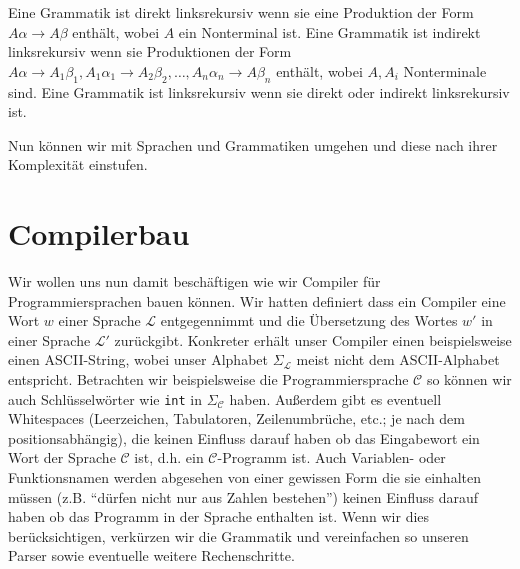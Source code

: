 \begin{defn}[Linksrekursiv]
Eine Grammatik ist direkt linksrekursiv wenn sie eine Produktion der Form $A\alpha \to A\beta$ enthält, wobei $A$ ein Nonterminal ist.
Eine Grammatik ist indirekt linksrekursiv wenn sie Produktionen der Form $A\alpha \to A_1\beta_1, A_1 \alpha_1 \to A_2\beta_2, \ldots, A_n \alpha_n \to A\beta_n$ enthält, wobei $A,A_i$ Nonterminale sind.
Eine Grammatik ist linksrekursiv wenn sie direkt oder indirekt linksrekursiv ist.
\end{defn}

Nun können wir mit Sprachen und Grammatiken umgehen und diese nach ihrer Komplexität einstufen.

\section{Compilerbau}
Wir wollen uns nun damit beschäftigen wie wir Compiler für Programmiersprachen bauen können.
Wir hatten definiert dass ein Compiler eine Wort $w$ einer Sprache $\mathcal{L}$ entgegennimmt und
die Übersetzung des Wortes $w'$ in einer Sprache $\mathcal{L}'$ zurückgibt.
Konkreter erhält unser Compiler einen beispielsweise einen ASCII-String, wobei unser Alphabet $\Sigma_\mathcal{L}$ meist
nicht dem ASCII-Alphabet entspricht. Betrachten wir beispielsweise die Programmiersprache $\mathcal{C}$ so können wir
auch Schlüsselwörter wie \verb|int| in $\Sigma_\mathcal{C}$ haben.
Außerdem gibt es eventuell Whitespaces (Leerzeichen, Tabulatoren, Zeilenumbrüche, etc.; je nach dem positionsabhängig), die keinen Einfluss darauf haben ob das
Eingabewort ein Wort der Sprache $\mathcal{C}$ ist, d.h. ein $\mathcal{C}$-Programm ist. Auch Variablen- oder Funktionsnamen werden abgesehen von einer
gewissen Form die sie einhalten müssen (z.B. ``dürfen nicht nur aus Zahlen bestehen'') keinen Einfluss darauf haben ob das Programm in der Sprache enthalten ist.
Wenn wir dies berücksichtigen, verkürzen wir die Grammatik und vereinfachen so unseren Parser sowie eventuelle weitere Rechenschritte.


